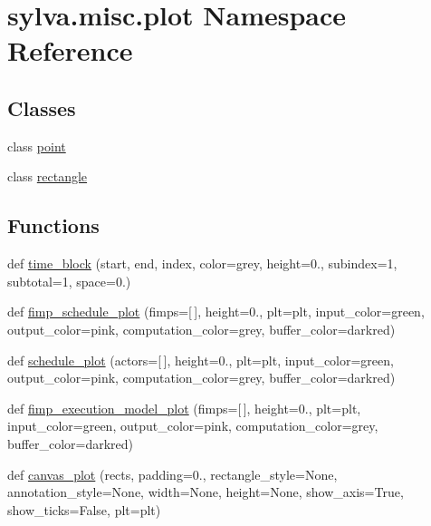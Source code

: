 \hypertarget{namespacesylva_1_1misc_1_1plot}{}\section{sylva.\+misc.\+plot Namespace Reference}
\label{namespacesylva_1_1misc_1_1plot}
\subsection*{Classes}
\begin{DoxyCompactItemize}
\item 
class \hyperlink{classsylva_1_1misc_1_1plot_1_1point}{point}
\item 
class \hyperlink{classsylva_1_1misc_1_1plot_1_1rectangle}{rectangle}
\end{DoxyCompactItemize}
\subsection*{Functions}
\begin{DoxyCompactItemize}
\item 
def \hyperlink{namespacesylva_1_1misc_1_1plot_a35e705ad0728f0ff413c9d4033bff7b4}{time\+\_\+block} (start, end, index, color=\textquotesingle{}grey\textquotesingle{}, height=0., subindex=1, subtotal=1, space=0.)
\item 
def \hyperlink{namespacesylva_1_1misc_1_1plot_a407cb01fd5820f94e98a438d04391c6e}{fimp\+\_\+schedule\+\_\+plot} (fimps=\mbox{[}$\,$\mbox{]}, height=0., plt=plt, input\+\_\+color=\textquotesingle{}green\textquotesingle{}, output\+\_\+color=\textquotesingle{}pink\textquotesingle{}, computation\+\_\+color=\textquotesingle{}grey\textquotesingle{}, buffer\+\_\+color=\textquotesingle{}darkred\textquotesingle{})
\item 
def \hyperlink{namespacesylva_1_1misc_1_1plot_a2937dd66c98822d9914353fc15105e14}{schedule\+\_\+plot} (actors=\mbox{[}$\,$\mbox{]}, height=0., plt=plt, input\+\_\+color=\textquotesingle{}green\textquotesingle{}, output\+\_\+color=\textquotesingle{}pink\textquotesingle{}, computation\+\_\+color=\textquotesingle{}grey\textquotesingle{}, buffer\+\_\+color=\textquotesingle{}darkred\textquotesingle{})
\item 
def \hyperlink{namespacesylva_1_1misc_1_1plot_a2e27375ca68228e819017903e39e39d9}{fimp\+\_\+execution\+\_\+model\+\_\+plot} (fimps=\mbox{[}$\,$\mbox{]}, height=0., plt=plt, input\+\_\+color=\textquotesingle{}green\textquotesingle{}, output\+\_\+color=\textquotesingle{}pink\textquotesingle{}, computation\+\_\+color=\textquotesingle{}grey\textquotesingle{}, buffer\+\_\+color=\textquotesingle{}darkred\textquotesingle{})
\item 
def \hyperlink{namespacesylva_1_1misc_1_1plot_a405ea3f626f2fbeea085e412f742ce68}{canvas\+\_\+plot} (rects, padding=0., rectangle\+\_\+style=None, annotation\+\_\+style=None, width=None, height=None, show\+\_\+axis=True, show\+\_\+ticks=False, plt=plt)
\end{DoxyCompactItemize}
